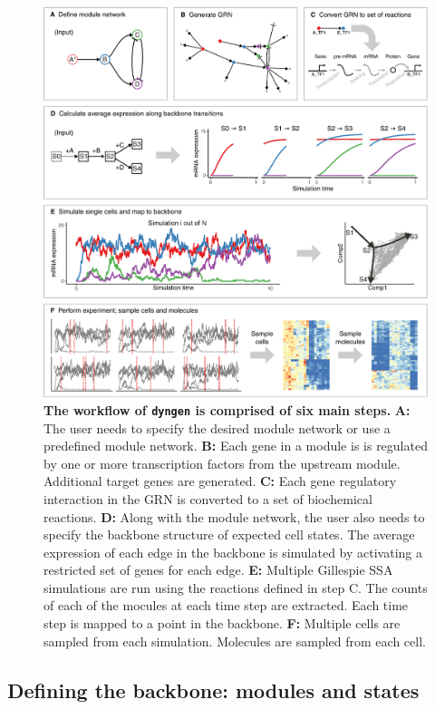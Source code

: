 \begin{figure}[htb!]
	\centering
	\includegraphics[width=\hugefigure]{fig/explain_methods} 
	\caption{\textbf{The workflow of \texttt{dyngen} is comprised of six main steps.} \textbf{A:} The user needs to specify the desired module network or use a predefined module network. \textbf{B:} Each gene in a module is is regulated by one or more transcription factors from the upstream module. Additional target genes are generated. \textbf{C:} Each gene regulatory interaction in the GRN is converted to a set of biochemical reactions. \textbf{D:} Along with the module network, the user also needs to specify the backbone structure of expected cell states. The average expression of each edge in the backbone is simulated by activating a restricted set of genes for each edge. \textbf{E:} Multiple Gillespie SSA simulations are run using the reactions defined in step C.  The counts of each of the mocules at each time step are extracted. Each time step is mapped to a point in the backbone. \textbf{F:} Multiple cells are sampled from each simulation. Molecules are sampled from each cell.}
	\label{fig:explain_methods}
\end{figure}

\subsection{Defining the backbone: modules and states} \label{sec:backbone}

